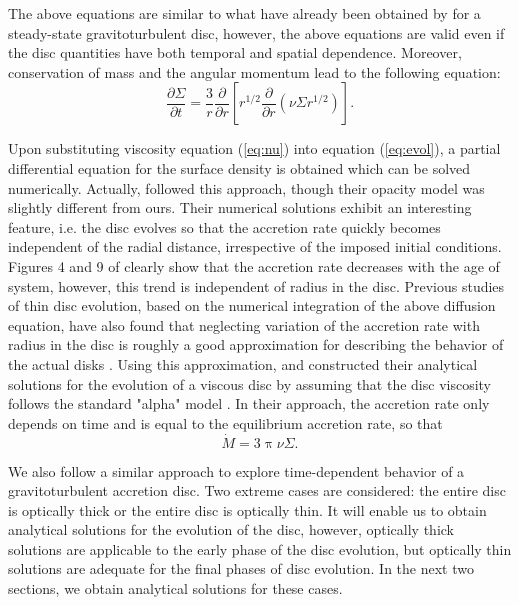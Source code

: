 \documentclass[apj]{emulateapj}
\begin{document}
The above equations are similar to what  have already been obtained by \cite{rafikov2009} for a steady-state gravitoturbulent disc, however, the above equations are valid even if the  disc quantities have both temporal and spatial dependence. Moreover, conservation of mass and the angular momentum lead to the following equation:
%
%
\begin{equation}\label{eq:evol}
\frac{\partial\Sigma}{\partial t} = \frac{3}{r} \frac{\partial}{\partial r} \left [ r^{1/2} \frac{\partial}{\partial r} \left ( \nu \Sigma r^{1/2} \right ) \right ].
\end{equation}
%

Upon substituting viscosity equation (\ref{eq:nu}) into  equation (\ref{eq:evol}), a partial differential equation for the surface density is obtained which can be solved numerically. Actually, \cite{rice2009} followed this approach, though their opacity model was slightly different from ours. Their numerical solutions exhibit an interesting feature, i.e. the disc evolves so   that the accretion rate quickly becomes independent of the radial distance, irrespective of the imposed initial conditions. Figures 4 and 9 of \cite{rice2009} clearly show that the accretion rate decreases with the age of system, however, this trend is independent of radius in the disc. Previous studies of thin disc evolution, based on the numerical integration of the above diffusion equation, have also found that neglecting variation of the accretion rate with radius in the disc is roughly a good approximation  for describing the behavior of the actual disks \citep[e.g.,][]{ruden86,morfill,garaud,kennedy}. Using this approximation,  \cite{step98} and \cite{chambers}  constructed their analytical solutions for the evolution of a viscous disc by assuming that the disc viscosity follows the standard "alpha" model \citep{SSmodel}. In their approach, the accretion rate only depends on time and is equal to the equilibrium accretion rate, so that
%
\begin{equation}\label{eq:main}
\dot{M} = 3\uppi \nu \Sigma.
\end{equation}
%

We also follow a similar approach to explore time-dependent behavior of a gravitoturbulent accretion disc. Two extreme cases are considered:  the entire disc is optically thick or the entire disc is optically thin. It will enable us to obtain analytical solutions for the evolution of the disc, however, optically thick solutions are applicable to the early phase of the disc evolution, but optically thin solutions are adequate for the final phases of disc evolution. In the next two sections, we obtain analytical solutions for these cases.
\end{document}
